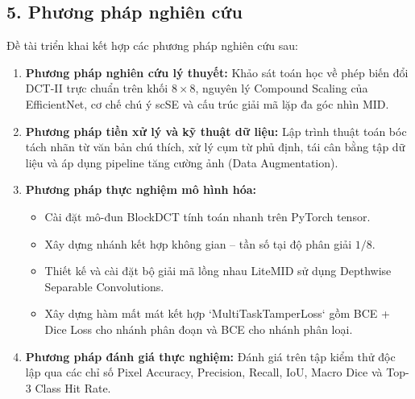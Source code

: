 \subsection{5. Phương pháp nghiên cứu}

\indent\indent Đề tài triển khai kết hợp các phương pháp nghiên cứu sau:\vspace{0.3cm}

\begin{enumerate}[label=\alph*)]
    \item \textbf{Phương pháp nghiên cứu lý thuyết:} Khảo sát toán học về phép biến đổi DCT-II trực chuẩn trên khối $8 \times 8$, nguyên lý Compound Scaling của EfficientNet, cơ chế chú ý scSE và cấu trúc giải mã lặp đa góc nhìn MID.
    \item \textbf{Phương pháp tiền xử lý và kỹ thuật dữ liệu:} Lập trình thuật toán bóc tách nhãn từ văn bản chú thích, xử lý cụm từ phủ định, tái cân bằng tập dữ liệu và áp dụng pipeline tăng cường ảnh (Data Augmentation).
    \item \textbf{Phương pháp thực nghiệm mô hình hóa:}
    \begin{itemize}
        \item Cài đặt mô-đun BlockDCT tính toán nhanh trên PyTorch tensor.
        \item Xây dựng nhánh kết hợp không gian -- tần số tại độ phân giải $1/8$.
        \item Thiết kế và cài đặt bộ giải mã lồng nhau LiteMID sử dụng Depthwise Separable Convolutions.
        \item Xây dựng hàm mất mát kết hợp `MultiTaskTamperLoss` gồm BCE + Dice Loss cho nhánh phân đoạn và BCE cho nhánh phân loại.
    \end{itemize}
    \item \textbf{Phương pháp đánh giá thực nghiệm:} Đánh giá trên tập kiểm thử độc lập qua các chỉ số Pixel Accuracy, Precision, Recall, IoU, Macro Dice và Top-3 Class Hit Rate.
\end{enumerate}
